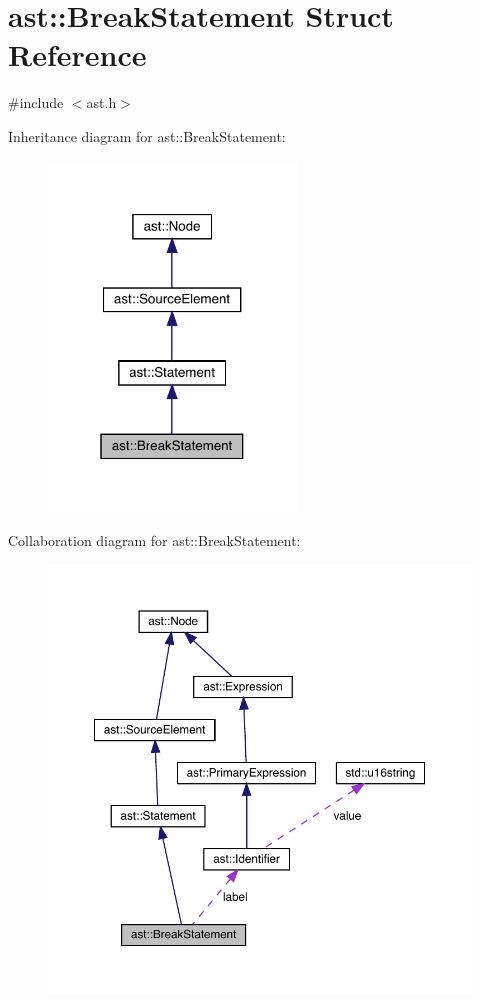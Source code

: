 \hypertarget{structast_1_1_break_statement}{}\section{ast\+:\+:Break\+Statement Struct Reference}
\label{structast_1_1_break_statement}


{\ttfamily \#include $<$ast.\+h$>$}



Inheritance diagram for ast\+:\+:Break\+Statement\+:\nopagebreak
\begin{figure}[H]
\begin{center}
\leavevmode
\includegraphics[width=187pt]{structast_1_1_break_statement__inherit__graph}
\end{center}
\end{figure}


Collaboration diagram for ast\+:\+:Break\+Statement\+:\nopagebreak
\begin{figure}[H]
\begin{center}
\leavevmode
\includegraphics[width=350pt]{structast_1_1_break_statement__coll__graph}
\end{center}
\end{figure}
